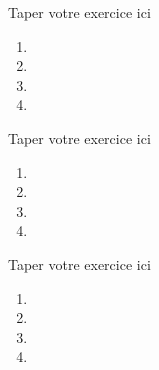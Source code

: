 \documentclass[a4paper, 12pt]{report}
\begin{document}
\begin{myexo}
 Taper votre exercice ici
 \begin{enumerate}
 \item 
 \item 
 \item 
 \item
 \end{enumerate}
\end{myexo}
\begin{myexo}
 Taper votre exercice ici
 \begin{enumerate}
 \item 
 \item 
 \item 
 \item
 \end{enumerate}
\end{myexo}
\begin{myexo}
 Taper votre exercice ici
 \begin{enumerate}
 \item 
 \item 
 \item 
 \item
 \end{enumerate}
\end{myexo}
\end{document}
